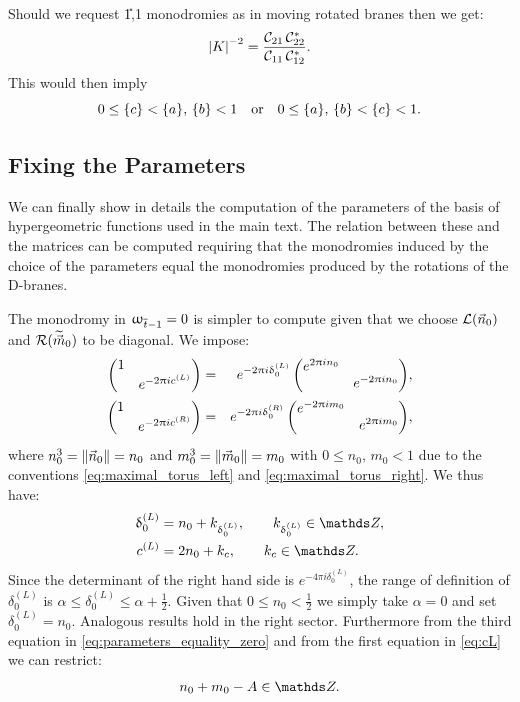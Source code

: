 Should we request \U{1,1} monodromies as in moving rotated branes then we get:
\begin{equation}
  \abs{K}^{-2}
  =
  \frac{\mathcal{C}_{21}\, \mathcal{C}^*_{22}}{\mathcal{C}_{11}\, \mathcal{C}^*_{12}}.
\end{equation}
This would then imply
\begin{equation}
  0 \le \{c\} < \{a\},\, \{b\} < 1
  \qq{or}
  0 \le \{a\},\, \{b\} < \{c\} < 1.
\end{equation}


\subsection{Fixing the Parameters}

We can finally show in details the computation of the parameters of the basis of hypergeometric functions used in the main text.
The relation between these and the  matrices can be computed requiring that the monodromies induced by the choice of the parameters equal the monodromies produced by the rotations of the D-branes.

The monodromy in $\upomega_{\overline{t}-1} = 0$ is simpler to compute given that we choose $\mathcal{L}(\vec{n}_{0})$ and $\mathcal{R}(\widetilde{\vec{m}}_{0})$ to be diagonal.
We impose:
\begin{eqnarray}
  \mqty( \dmat{1, e^{-2\pi i c^{(L)}}} )
  & = &
  e^{-2\pi i \delta_{0}^{(L)}}\,
  \mqty( \dmat{e^{2\pi i n_{0}}, e^{-2\pi i n_{0}}} ),
  \\
  \mqty( \dmat{1, e^{-2\pi i c^{(R)}}} )
  & = &
  e^{-2\pi i \delta_{0}^{(R)}}\,
  \mqty( \dmat{e^{-2\pi i m_{0}}, e^{2\pi i m_{0}}} ),
\end{eqnarray}
where $n^3_{0} = \norm{\vec{n}_{0}} = n_{0}$ and $m^3_{0} = \norm{\vec{m}_{0}} = m_{0}$ with $0 \le  n_{0},\, m_{0} < 1$ due to the conventions \eqref{eq:maximal_torus_left} and \eqref{eq:maximal_torus_right}.
We thus have:
\begin{equation}
  \begin{split}
    \delta_{0}^{(L)}
    & =
    n_{0} + k_{\delta^{(L)}_{0}},
    \qquad
    k_{\delta^{(L)}_{0}} \in \Z,
    \\
    c^{(L)}
    & =
    2 n_{0} + k_c,
    \qquad
    k_c \in \Z.
  \end{split}
  \label{eq:cL}
\end{equation}
Since the determinant of the right hand side is $e^{-4 \pi i \delta_{0}^{(L)}}$, the range of definition of $\delta_{0}^{(L)}$ is $\alpha \le \delta_{0}^{(L)} \le  \alpha + \frac{1}{2}$.
Given that $0 \le n_{0} < \frac{1}{2}$ we simply take $\alpha = 0$ and set $\delta_{0}^{(L)} = n_{0}$.
Analogous results hold in the right sector.
Furthermore from the third equation in \eqref{eq:parameters_equality_zero} and from the first equation in \eqref{eq:cL} we can restrict:
\begin{equation}
  n_{0} + m_{0} - A \in \Z.
\end{equation}

